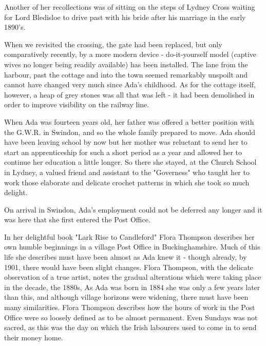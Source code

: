 Another of her recollections was of sitting on the steps of Lydney Cross waiting for Lord Bledisloe to drive past with his bride after his marriage in the early 1890’s.

When we revisited the crossing, the gate had been replaced, but only comparatively recently, by a more modern device - do-it-yourself model (captive wives no longer being readily available) has been installed. The lane from the harbour, past the cottage and into the town seemed remarkably unspoilt and cannot have changed very much since Ada’s childhood. As for the cottage itself, however, a heap of grey stones was all that was left - it had been demolished in order to improve visibility on the railway line.

When Ada was fourteen years old, her father was offered a better position with the G.W.R. in Swindon, and so the whole family prepared to move. Ada should have been leaving school by now but her mother was reluctant to send her to start an apprenticeship for such a short period as a year and allowed her to continue her education a little longer. So there she stayed, at the Church School in Lydney, a valued friend and assistant to the "Governess" who taught her to work those elaborate and delicate crochet patterns in which she took so much delight.

On arrival in Swindon, Ada's employment could not be deferred any longer and it was here that she first entered the Post Office.

In her delightful book "Lark Rise to Candleford" Flora Thompson describes her own humble beginnings in a village Post Office in Buckinghamshire. Much of this life she describes must have been almost as Ada knew it - though already, by 1901, there would have been slight changes. Flora Thompson, with the delicate observation of a true artist, notes the gradual alterations which were taking place in the decade, the 1880s, As Ada was born in 1884 she was only a few years later than this, and although village horizons were widening, there must have been many similarities. Flora Thompson describes how the hours of work in the Post Office were so loosely defined as to be almost permanent. Even Sundays was not sacred, as this was the day on which the Irish labourers used to come in to send their money home.

